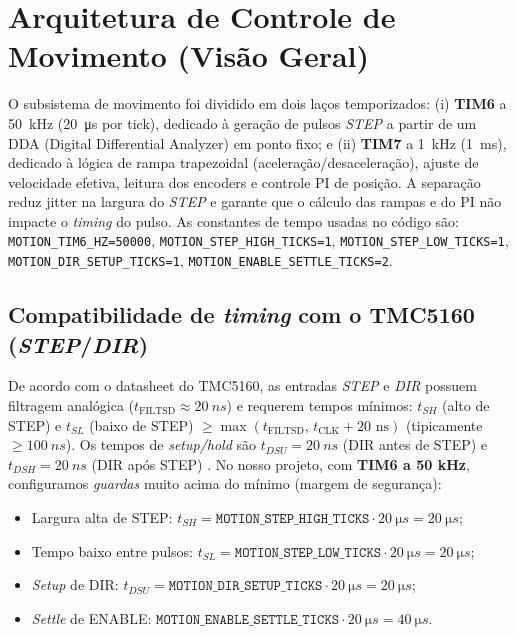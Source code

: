 \FloatBarrier
\section{Arquitetura de Controle de Movimento (Vis\~ao Geral)}
\label{sec:ctrl-visao-geral}

O subsistema de movimento foi dividido em dois la\c{c}os temporizados:
(i) \textbf{TIM6} a \SI{50}{kHz} (\SI{20}{\micro\second} por tick), dedicado \`a gera\c{c}\~ao de pulsos \emph{STEP} a partir de um DDA (Digital Differential Analyzer) em ponto fixo; e
(ii) \textbf{TIM7} a \SI{1}{kHz} (\SI{1}{ms}), dedicado \`a l\'ogica de rampa trapezoidal (acelera\c{c}\~ao/desacelera\c{c}\~ao), ajuste de velocidade efetiva, leitura dos encoders e controle PI de posi\c{c}\~ao.
A separa\c{c}\~ao reduz jitter na largura do \emph{STEP} e garante que o c\'alculo das rampas e do PI n\~ao impacte o \emph{timing} do pulso. As constantes de tempo usadas no c\'odigo s\~ao:
\texttt{MOTION\_TIM6\_HZ=50000}, \texttt{MOTION\_STEP\_HIGH\_TICKS=1}, \texttt{MOTION\_STEP\_LOW\_TICKS=1}, \texttt{MOTION\_DIR\_SETUP\_TICKS=1}, \texttt{MOTION\_ENABLE\_SETTLE\_TICKS=2}.

\subsection{Compatibilidade de \emph{timing} com o TMC5160 (\emph{STEP}/\emph{DIR})}
\label{subsec:tmc-step-dir}

De acordo com o datasheet do TMC5160, as entradas \emph{STEP} e \emph{DIR} possuem filtragem anal\'ogica ($t_{\text{FILTSD}}\approx\SI{20}{ns}$) e requerem tempos m\'inimos:
$t_{SH}$ (alto de STEP) e $t_{SL}$ (baixo de STEP) $\ge \max(t_{\text{FILTSD}},\,t_{\text{CLK}}+20\text{ ns})$ (tipicamente $\ge\SI{100}{ns}$). Os tempos de \emph{setup/hold} s\~ao $t_{DSU}=\SI{20}{ns}$ (DIR antes de STEP) e $t_{DSH}=\SI{20}{ns}$ (DIR ap\'os STEP) \cite{tmc5160_ds}.
No nosso projeto, com \textbf{TIM6 a 50 kHz}, configuramos \emph{guardas} muito acima do m\'inimo (margem de seguran\c{c}a):
\begin{itemize}
  \item Largura alta de STEP: $t_{SH} = \texttt{MOTION\_STEP\_HIGH\_TICKS}\cdot\SI{20}{\micro s} = \SI{20}{\micro s}$;
  \item Tempo baixo entre pulsos: $t_{SL} = \texttt{MOTION\_STEP\_LOW\_TICKS}\cdot\SI{20}{\micro s} = \SI{20}{\micro s}$;
  \item \emph{Setup} de DIR: $t_{DSU} = \texttt{MOTION\_DIR\_SETUP\_TICKS}\cdot\SI{20}{\micro s} = \SI{20}{\micro s}$;
  \item \emph{Settle} de ENABLE: $\texttt{MOTION\_ENABLE\_SETTLE\_TICKS}\cdot\SI{20}{\micro s} = \SI{40}{\micro s}$.
\end{itemize}

